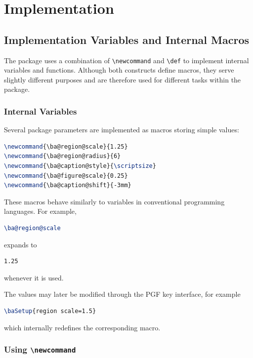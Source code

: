 \section{Implementation}
\subsection{Implementation Variables and Internal Macros}

The package uses a combination of \lstinline|\newcommand| and \lstinline|\def| to implement internal variables and functions. Although both constructs define macros, they serve slightly different purposes and are therefore used for different tasks within the package.

\subsubsection{Internal Variables}

Several package parameters are implemented as macros storing simple values:

\begin{lstlisting}[language={LaTeX}]
\newcommand{\ba@region@scale}{1.25}
\newcommand{\ba@region@radius}{6}
\newcommand{\ba@caption@style}{\scriptsize}
\newcommand{\ba@figure@scale}{0.25}
\newcommand{\ba@caption@shift}{-3mm}
\end{lstlisting}

These macros behave similarly to variables in conventional programming languages. For example,

\begin{lstlisting}[language={LaTeX}]
\ba@region@scale
\end{lstlisting}

expands to

\begin{lstlisting}[language=LaTeX]
1.25
\end{lstlisting}

whenever it is used.

The values may later be modified through the PGF key interface, for example

\begin{lstlisting}[language={LaTeX}]
\baSetup{region scale=1.5}
\end{lstlisting}

which internally redefines the corresponding macro.

\subsubsection{Using \texttt{\textbackslash newcommand}}

